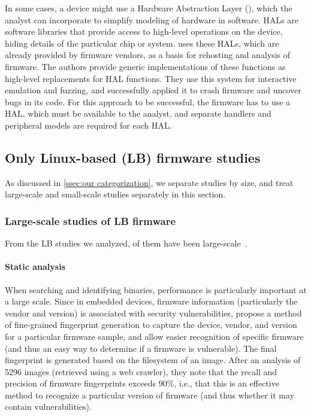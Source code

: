 In some cases, a device might use a Hardware Abstraction Layer (), which the analyst can incorporate to simplify modeling of hardware in software.
HALs are software libraries that provide access to high-level operations on the device, hiding details of the particular chip or system.
 uses these HALs, which are already provided by firmware vendors, as a basis for rehosting and analysis of firmware.
The authors provide generic implementations of these functions as high-level replacements for HAL functions.
They use this system for interactive emulation and fuzzing, and successfully applied it to crash firmware and uncover bugs in its code.
For this approach to be successful, the firmware has to use a HAL, which must be available to the analyst, and separate handlers and peripheral models are required for each HAL.

\subsection{Only Linux-based (LB) firmware studies}\label{sec:only LB firmware}
As discussed in \autoref{ssec:our categorization}, we separate studies by size, and treat large-scale and small-scale studies separately in this section.

\subsubsection{Large-scale studies of LB firmware}
From the LB studies we analyzed,  of them have been large-scale~\cite{chen2016towards, david2018firmup, srivastava2019firmfuzz, kim2020firmae, zhang2019cryptorex, li2018towards, yu2022building, costin2016automated}.

\paragraph{Static analysis}
When searching and identifying binaries, performance is particularly important at a large scale.
Since in embedded devices, firmware information (particularly the vendor and version) is associated with security vulnerabilities,  propose a method of fine-grained fingerprint generation to capture the device, vendor, and version for a particular firmware sample, and allow easier recognition of specific firmware (and thus an easy way to determine if a firmware is vulnerable).
The final fingerprint is generated based on the filesystem of an image.
After an analysis of \num{5296} images (retrieved using a web crawler), they note that the recall and precision of firmware fingerprints exceeds 90\%, i.e., that this is an effective method to recognize a particular version of firmware (and thus whether it may contain vulnerabilities).

